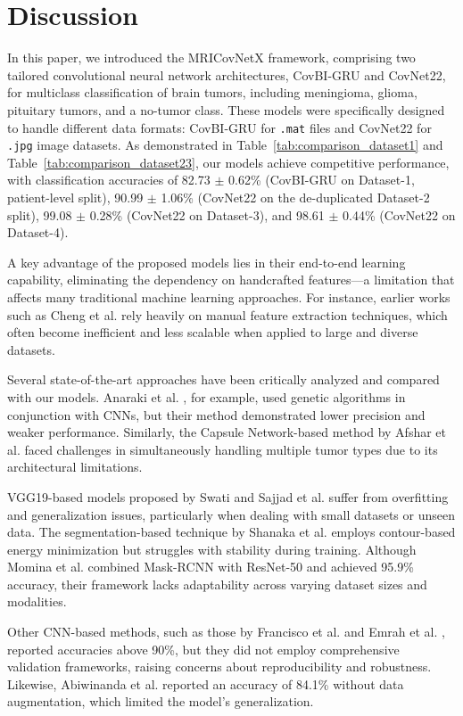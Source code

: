 \documentclass[a4paper,fleqn]{cas-sc}
\begin{document}
\section{Discussion} \label{sec5}

In this paper, we introduced the MRICovNetX framework, comprising two tailored convolutional neural network architectures, CovBI-GRU and CovNet22, for multiclass classification of brain tumors, including meningioma, glioma, pituitary tumors, and a no-tumor class. These models were specifically designed to handle different data formats: CovBI-GRU for \texttt{.mat} files and CovNet22 for \texttt{.jpg} image datasets. As demonstrated in Table~\ref{tab:comparison_dataset1} and Table~\ref{tab:comparison_dataset23}, our models achieve competitive performance, with classification accuracies of 82.73 $\pm$ 0.62\% (CovBI-GRU on Dataset-1, patient-level split), 90.99 $\pm$ 1.06\% (CovNet22 on the de-duplicated Dataset-2 split), 99.08 $\pm$ 0.28\% (CovNet22 on Dataset-3), and 98.61 $\pm$ 0.44\% (CovNet22 on Dataset-4).

A key advantage of the proposed models lies in their end-to-end learning capability, eliminating the dependency on handcrafted features—a limitation that affects many traditional machine learning approaches. For instance, earlier works such as Cheng et al. \cite{R27} rely heavily on manual feature extraction techniques, which often become inefficient and less scalable when applied to large and diverse datasets.

Several state-of-the-art approaches have been critically analyzed and compared with our models. Anaraki et al. \cite{R24}, for example, used genetic algorithms in conjunction with CNNs, but their method demonstrated lower precision and weaker performance. Similarly, the Capsule Network-based method by Afshar et al. \cite{R48} faced challenges in simultaneously handling multiple tumor types due to its architectural limitations.

VGG19-based models proposed by Swati and Sajjad et al. \cite{R31, R32} suffer from overfitting and generalization issues, particularly when dealing with small datasets or unseen data. The segmentation-based technique by Shanaka et al. \cite{R49} employs contour-based energy minimization but struggles with stability during training. Although Momina et al. \cite{R50} combined Mask-RCNN with ResNet-50 and achieved 95.9\% accuracy, their framework lacks adaptability across varying dataset sizes and modalities.

Other CNN-based methods, such as those by Francisco et al. and Emrah et al. \cite{R51, R52}, reported accuracies above 90\%, but they did not employ comprehensive validation frameworks, raising concerns about reproducibility and robustness. Likewise, Abiwinanda et al. \cite{R12} reported an accuracy of 84.1\% without data augmentation, which limited the model's generalization.
\end{document}
